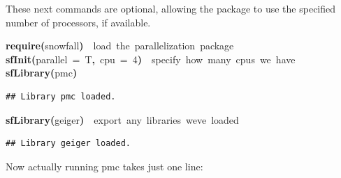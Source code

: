 \documentclass{elsarticle}
\makeatletter
\newcommand{\hlnumber}[1]{\textcolor[rgb]{0,0,0}{#1}}%
\newcommand{\hlfunctioncall}[1]{\textcolor[rgb]{.5,0,.33}{\textbf{#1}}}%
\newcommand{\hlkeyword}[1]{\textbf{#1}}%
\newcommand{\hlargument}[1]{\textcolor[rgb]{.69,.25,.02}{#1}}%
\newcommand{\hlcomment}[1]{\textcolor[rgb]{.18,.6,.34}{#1}}%
\newcommand{\hlsymbol}[1]{#1}%
\newcommand{\hlstd}[1]{\textcolor[rgb]{0,0,0}{#1}}%
\newenvironment{kframe}{%
 \def\FrameCommand##1{\hskip\@totalleftmargin \hskip-\fboxsep
 \colorbox{shadecolor}{##1}\hskip-\fboxsep
     \hskip-\linewidth \hskip-\@totalleftmargin \hskip\columnwidth}%
 \MakeFramed {\advance\hsize-\width
   \@totalleftmargin\z@ \linewidth\hsize
   \@setminipage}}%
 {\par\unskip\endMakeFramed}
\newenvironment{knitrout}{}{} %
\makeatother
\begin{document}
These next commands are optional, allowing the package to use the specified number of processors, if available.  
\begin{knitrout}
\color{fgcolor}\begin{kframe}
\begin{flushleft}
\ttfamily\noindent
\hlfunctioncall{require}\hlkeyword{(}\hlsymbol{snowfall}\hlkeyword{)}{\ }{\ }\hlcomment{\usebox{\hlnormalsizeboxhash}{\ }load{\ }the{\ }parallelization{\ }package}\hspace*{\fill}\\
\hlstd{}\hlfunctioncall{sfInit}\hlkeyword{(}\hlargument{parallel}{\ }\hlargument{=}{\ }\hlsymbol{T}\hlkeyword{,}{\ }\hlargument{cpu}{\ }\hlargument{=}{\ }\hlnumber{4}\hlkeyword{)}{\ }{\ }\hlcomment{\usebox{\hlnormalsizeboxhash}{\ }specify{\ }how{\ }many{\ }cpus{\ }we{\ }have}\hspace*{\fill}\\
\hlstd{}\hlfunctioncall{sfLibrary}\hlkeyword{(}\hlsymbol{pmc}\hlkeyword{)}\mbox{}
\normalfont
\end{flushleft}
\begin{verbatim}
## Library pmc loaded.
\end{verbatim}
\begin{flushleft}
\ttfamily\noindent
\hlfunctioncall{sfLibrary}\hlkeyword{(}\hlsymbol{geiger}\hlkeyword{)}{\ }{\ }\hlcomment{\usebox{\hlnormalsizeboxhash}{\ }export{\ }any{\ }libraries{\ }we\usebox{\hlnormalsizeboxsinglequote}ve{\ }loaded}\mbox{}
\normalfont
\end{flushleft}
\begin{verbatim}
## Library geiger loaded.
\end{verbatim}
\end{kframe}
\end{knitrout}


Now actually running pmc takes just one line:
\end{document}
